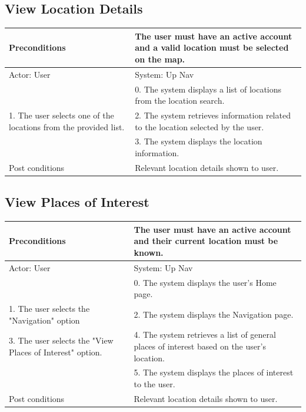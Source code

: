 \documentclass{article}
\begin{document}
\begin{enumerate}
	\subsection{View Location Details}
	
		\begin{tabular}{ | m{15em} | m{15em}| } 
		\hline
		Preconditions                                                     					& The user must have an active account and a valid location must be selected on the map. \\ 
		\hline
		Actor: User                                                      					& System: Up Nav  \\ 
		\hline
                                                                 							& 0. The system displays a list of locations from the location search.  \\
		 \hline
		1. The user selects one of the locations from the provided list. 		& 2. The system retrieves information related to the location selected by the user. \\ 
		\hline
                                                                 							& 3. The system displays the location information. \\ 
		\hline
		Post conditions									& Relevant location details shown to user. \\
		\hline
		\end{tabular}

	\subsection{View Places of Interest}
	
	\centering
		\begin{tabular}{ | m{15em} | m{15em}| }
		\hline
		Preconditions                                             				& The user must have an active account and their current location must be known. \\ 
		\hline
		Actor: User                                              				& System: Up Nav \\
		 \hline
                                                          							& 0. The system displays the user's Home page. \\
		\hline
		1. The user selects the "Navigation" option				& 2. The system displays the Navigation page. \\
		\hline
		3. The user selects the "View Places of Interest" option. 		& 4. The system retrieves a list of general places of interest based on the user's location. \\ 
		\hline
                                                          							& 5. The system displays the places of interest to the user. \\ 
		\hline
		Post conditions								& Relevant location details shown to user. \\
		\hline
		\end{tabular}


\end{enumerate}
\end{document}
